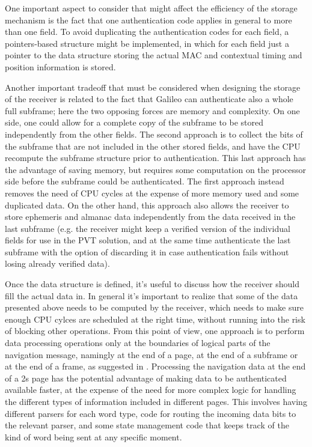 One important aspect to consider that might affect the efficiency of the storage
mechanism is the fact that one authentication code applies in general to more
than one field. To avoid duplicating the authentication codes for each field, a
pointers-based structure might be implemented, in which for each field just a
pointer to the data structure storing the actual MAC and contextual timing and
position information is stored.

Another important tradeoff that must be considered when designing the storage of
the receiver is related to the fact that Galileo can authenticate also a whole
full subframe; here the two opposing forces are memory and complexity. On one
side, one could allow for a complete copy of the subframe to be stored
independently from the other fields. The second approach is to collect the bits
of the subframe that are not included in the other stored fields, and have the
CPU recompute the subframe structure prior to authentication. This last approach
has the advantage of saving memory, but requires some computation on the
processor side before the subframe could be authenticated. The first approach
instead removes the need of CPU cycles at the expense of more memory used and
some duplicated data. On the other hand, this approach also allows the receiver
to store ephemeris and almanac data independently from the data received in the
last subframe (e.g. the receiver might keep a verified version of the individual
fields for use in the PVT solution, and at the same time authenticate the last
subframe with the option of discarding it in case authentication fails without
losing already verified data).

\vspace{\baselineskip}

Once the data structure is defined, it's useful to discuss how the receiver
should fill the actual data in. In general it's important to realize that some
of the data presented above needs to be computed by the receiver, which needs to
make sure enough CPU cylces are scheduled at the right time, without running
into the risk of blocking other operations. From this point of view, one
approach is to perform data processing operations only at the boundaries of
logical parts of the navigation message, namingly at the end of a page, at the
end of a subframe or at the end of a frame, as suggested in
\cite{galileo_book}. Processing the navigation data at the end of a
\num{2}\si{s} page has the potential advantage of making data to be
authenticated available faster, at the expense of the need for more complex
logic for handling the different types of information included in different
pages. This involves having different parsers for each word type, code for
routing the incoming data bits to the relevant parser, and some state management
code that keeps track of the kind of word being sent at any specific moment.

